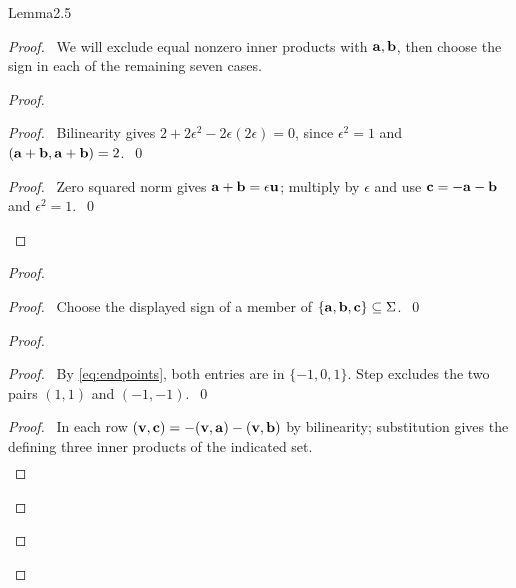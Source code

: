 \begin{cgss}{Lemma}{2.5}\label{lem:2.5}
\end{cgss}
\begin{proof}
 \pfsketch\ We will exclude equal nonzero inner products with ${\mathbf a},{\mathbf b}$, then choose the
 sign in each of the remaining seven cases.
 \begin{proof}
  \begin{proof}
   \pf\ Bilinearity gives $2+2\epsilon^2-2\epsilon(2\epsilon)=0$, since
   $\epsilon^2=1$ and $({\mathbf a}+{\mathbf b},{\mathbf a}+{\mathbf b})=2$.~\qed
  \end{proof}
  \qedstep
  \begin{proof}
   \pf\ Zero squared norm gives ${\mathbf a}+{\mathbf b}=\epsilon{\mathbf u}$; multiply by $\epsilon$ and use
   ${\mathbf c}=-{\mathbf a}-{\mathbf b}$ and $\epsilon^2=1$.~\qed
  \end{proof}
 \end{proof}
 \begin{proof}
  \begin{proof}\pf\ Choose the displayed sign of a member of $\{{\mathbf a},{\mathbf b},{\mathbf c}\}\subseteq\Sigma$.~\qed\end{proof}
  \begin{proof}
   \begin{proof}
    \pf\ By \eqref{eq:endpoints}, both entries are in $\{-1,0,1\}$.
    Step  excludes the two pairs $(1,1)$ and $(-1,-1)$.~\qed
   \end{proof}
   \begin{proof}
    \pf\ In each row $({\mathbf v},{\mathbf c})=-({\mathbf v},{\mathbf a})-({\mathbf v},{\mathbf b})$ by bilinearity;
    substitution gives the defining three inner products of the indicated set.
    \[
    \begin{array}{c|rrrrrrr}

\end{array}\]
\end{proof}
\end{proof}
\end{proof}
\end{proof}
